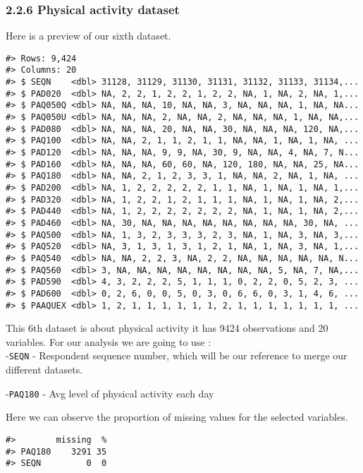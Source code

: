 \documentclass[
]{article}
\begin{document}
\hypertarget{physical-activity-dataset}{%
\subsubsection{2.2.6 Physical activity
dataset}\label{physical-activity-dataset}}

Here is a preview of our sixth dataset.

\begin{verbatim}
#> Rows: 9,424
#> Columns: 20
#> $ SEQN    <dbl> 31128, 31129, 31130, 31131, 31132, 31133, 31134,...
#> $ PAD020  <dbl> NA, 2, 2, 1, 2, 2, 1, 2, 2, NA, 1, NA, 2, NA, 1,...
#> $ PAQ050Q <dbl> NA, NA, NA, 10, NA, NA, 3, NA, NA, NA, 1, NA, NA...
#> $ PAQ050U <dbl> NA, NA, NA, 2, NA, NA, 2, NA, NA, NA, 1, NA, NA,...
#> $ PAD080  <dbl> NA, NA, NA, 20, NA, NA, 30, NA, NA, NA, 120, NA,...
#> $ PAQ100  <dbl> NA, NA, 2, 1, 1, 2, 1, 1, NA, NA, 1, NA, 1, NA, ...
#> $ PAD120  <dbl> NA, NA, NA, 9, 9, NA, 30, 9, NA, NA, 4, NA, 7, N...
#> $ PAD160  <dbl> NA, NA, NA, 60, 60, NA, 120, 180, NA, NA, 25, NA...
#> $ PAQ180  <dbl> NA, NA, 2, 1, 2, 3, 3, 1, NA, NA, 2, NA, 1, NA, ...
#> $ PAD200  <dbl> NA, 1, 2, 2, 2, 2, 2, 1, 1, NA, 1, NA, 1, NA, 1,...
#> $ PAD320  <dbl> NA, 1, 2, 2, 1, 2, 1, 1, 1, NA, 1, NA, 1, NA, 2,...
#> $ PAD440  <dbl> NA, 1, 2, 2, 2, 2, 2, 2, 2, NA, 1, NA, 1, NA, 2,...
#> $ PAD460  <dbl> NA, 30, NA, NA, NA, NA, NA, NA, NA, NA, 30, NA, ...
#> $ PAQ500  <dbl> NA, 1, 3, 2, 3, 3, 3, 2, 3, NA, 1, NA, 3, NA, 3,...
#> $ PAQ520  <dbl> NA, 3, 1, 3, 1, 3, 1, 2, 1, NA, 1, NA, 3, NA, 1,...
#> $ PAQ540  <dbl> NA, NA, 2, 2, 3, NA, 2, 2, NA, NA, NA, NA, NA, N...
#> $ PAQ560  <dbl> 3, NA, NA, NA, NA, NA, NA, NA, NA, 5, NA, 7, NA,...
#> $ PAD590  <dbl> 4, 3, 2, 2, 2, 5, 1, 1, 1, 0, 2, 2, 0, 5, 2, 3, ...
#> $ PAD600  <dbl> 0, 2, 6, 0, 0, 5, 0, 3, 0, 6, 6, 0, 3, 1, 4, 6, ...
#> $ PAAQUEX <dbl> 1, 2, 1, 1, 1, 1, 1, 1, 2, 1, 1, 1, 1, 1, 1, 1, ...
\end{verbatim}

This 6th dataset is about physical activity it has 9424 observations and
20 variables. For our analysis we are going to use :\\
-\texttt{SEQN} - Respondent sequence number, which will be our reference
to merge our different datasets.

-\texttt{PAQ180} - Avg level of physical activity each day

Here we can observe the proportion of missing values for the selected
variables.

\begin{verbatim}
#>        missing  %
#> PAQ180    3291 35
#> SEQN         0  0
\end{verbatim}
\end{document}
